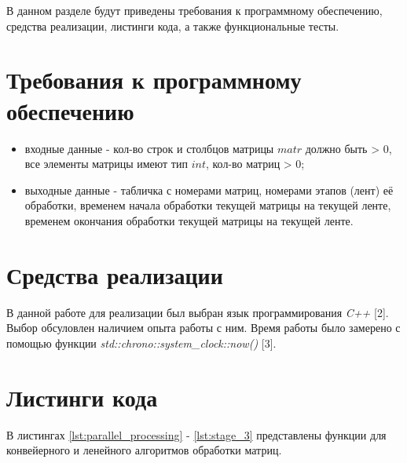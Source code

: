 \documentclass[a4paper,14pt, unknownkeysallowed]{extreport}
\begin{document}
В данном разделе будут приведены требования к программному обеспечению, средства реализации, листинги кода, а также функциональные тесты.

\section{Требования к программному обеспечению}

\begin{itemize}
    \item входные данные - кол-во строк и столбцов матрицы $matr$ должно быть > 0, все элементы матрицы имеют тип $int$, кол-во матриц > 0;
    \item выходные данные - табличка с номерами матриц, номерами этапов (лент) её обработки, временем начала обработки текущей матрицы на текущей ленте, временем окончания обработки текущей матрицы на текущей ленте.
\end{itemize}

\section{Средства реализации}

В данной работе для реализации был выбран язык программирования \textit{C++} [2]. Выбор обсуловлен наличием опыта работы с ним. Время работы было замерено с помощью функции \textit{std::chrono::system\_clock::now()} [3].

\clearpage

\section{Листинги кода}

В листингах \ref{lst:parallel_processing} - \ref{lst:stage_3} представлены функции для конвейерного и ленейного алгоритмов обработки матриц.
\end{document}
